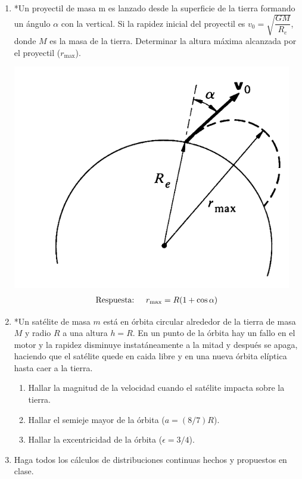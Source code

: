 \documentclass[11pt,twocolumn]{article}
\begin{document}
\begin{enumerate}
\item *Un proyectil de masa m es lanzado desde la superficie de la tierra formando un  ángulo $\alpha$ con la vertical. Si la rapidez inicial del proyectil es $v_0=\sqrt{\dfrac{GM}{R_e}}$, donde $M$ es la masa de la tierra. Determinar la altura máxima alcanzada por el proyectil ($r_{\text{max}}$).

\includegraphics[scale=0.3]{tiro}
\begin{align*}
\text{Respuesta:}\hspace{0.5 cm} r_{\text{max}}=R(1+\cos\alpha)
\end{align*}

\item *Un satélite de masa $m$ está en órbita circular alrededor de la tierra de masa $M$ y radio $R$ a una altura $h=R$. En un punto de la órbita hay un fallo en el motor y la rapidez disminuye instatáneamente a la mitad y después se apaga, haciendo que el satélite quede en caida libre y en una nueva órbita elíptica hasta caer a la tierra.
\begin{enumerate}
\item Hallar la magnitud de la velocidad cuando el satélite impacta sobre la tierra.
\item Hallar el semieje mayor de la órbita ($a=(8/7)R$).
\item Hallar la excentricidad de la órbita ($\epsilon=3/4$).
\end{enumerate}

\item Haga todos los cálculos de distribuciones continuas hechos y propuestos en clase.


\end{enumerate}
\end{document}
